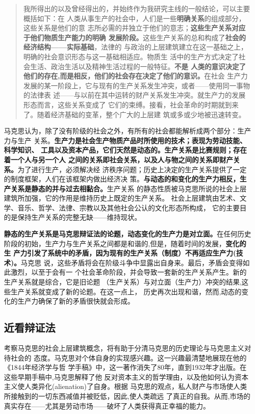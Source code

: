 \begin{quotation}
  我所得出的以及曾经得出的，并始终作为我研究主线的一般结论，可以主要概括如下：在
  人类从事生产的社会中，人们是一些\textbf{明确关系}的组成部分，这些关系是他们的意
  志所必需的并独立于他们的意志；\textbf{这些生产关系对应于他们物质生产能力的明确
    发展阶段。}这些生产关系的总和构成了\textbf{社会的经济结构——实际基础}，法律的
  与政治的上层建筑建立在这一基础之上，明确的社会意识形态与这一基础相适应。物质生
  活中的生产方式决定了社会生活、政治生活以及精神生活过程的一般特征。\textbf{不是
    人类的意识决定了他们的存在,而是相反，他们的社会存在决定了他们的意识。}在社会
  生产力发展的某一阶段上，它与现有的生产关系发生冲突，或者——使用同一事物的法律表
  述——与以前在其中运转的财产关系发生冲突。就生产力的发展形态而言，这些关系变成了
  它们的束缚。接看，社会革命的时期就到来了。随着经济基础的变革，整个广大的上层建
  筑或多或少地被迅速转变。
\end{quotation}

马克思认为，除了没有阶级的社会之外，有所有的社会都能解析成两个部分：生产力与生产
关系。\textbf{生产力是社会生产物质产品时所使用的技术；表现为劳动技能、科学知识、
  工具以及资本产品，它们天然是动态的。生产关系是比赛规则；存在着一个人与另一个人
  之间的关系即社会关系，以及人与物之间的关系即财产关系。}为了进行生产，必须解决经
济秩序问题；历史上决定的生产关系提供了一定的制度框架，人们在该框架内做出经济决
策。\textbf{与动态的和变化的生产力相反，生产关系是静态的并与过去相黏合。}生产关系
的静态性质被马克思所说的社会上层建筑所加强，它的作用是维持历史上既定的生产关系。
社会上层建筑由艺术、文学、音乐、哲学、法律、宗教以及其他社会公认的文化形态所构成，
它的主要目的是保持生产关系的完整无缺——维持现状。

\textbf{静态的生产关系是马克思辩证法的论题，动态变化的生产力是对立面。}在任何历史
阶段的初始，生产力与生产关系之间都是和谐的,但是，随着时间的发展，\textbf{变化的生
  产力引发了系统中的矛盾，因为现有的生产关系（制度）不再适应生产力(技术)。}马克思
说，这些矛盾将会在阶级斗争中显露出自身来。最后，矛盾会变得如此激烈，以至于会有一
个社会革命阶段，并会导致一套新的生产关系产生。新的生产关系就是综合，它是旧论题
（生产关系）与对立面（生产力）冲突的结果,这些生产关系就变成了新的论题。在这一点上，
历史再次出现和谐，然而,动态的变化的生产力确保了新的矛盾很快就会形成。

\subsection{近看辩证法}

考察马克思的社会上层建筑概念，将有助于分清马克思的历史理论与马克思主义对待社会的
态度。马克思对个体自身的实现感兴趣。这一兴趣最清楚地展现在他的《1844年经济学与哲
学手稿》中，这一著作消失了80年，直到1932年才出版。在这些早期手稿中,马克思解释了他
反对资本主义的哲学理由，以及他如何认为资本主义使人类异化(alienation)了自身。根据
马克思的观点，私人财产与市场使人类所接触到的一切东西减值并被贬低，因此,使人类疏远
了真正的自我。从而,市场的真实存在——尤其是劳动市场——破坏了人类获得真正幸福的能力。

